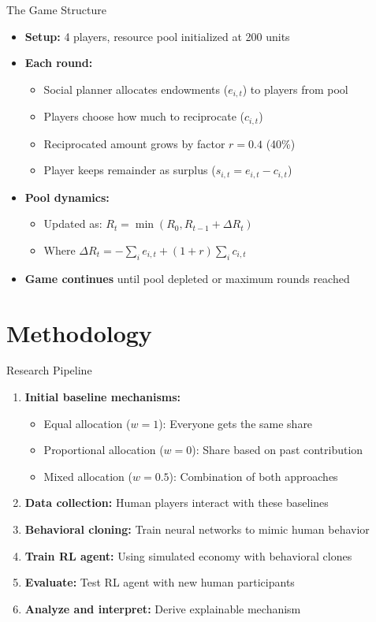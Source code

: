 \documentclass[aspectratio=169]{beamer} %
\begin{document}
\begin{frame}{The Game Structure}
\begin{itemize}
    \item \textbf{Setup:} 4 players, resource pool initialized at 200 units
    \item \textbf{Each round:}
    \begin{itemize}
        \item Social planner allocates endowments ($e_{i,t}$) to players from pool
        \item Players choose how much to reciprocate ($c_{i,t}$)
        \item Reciprocated amount grows by factor $r = 0.4$ (40\%)
        \item Player keeps remainder as surplus ($s_{i,t} = e_{i,t} - c_{i,t}$)
    \end{itemize}
    \item \textbf{Pool dynamics:} 
    \begin{itemize}
        \item Updated as: $R_t = \min(R_0, R_{t-1} + \Delta R_t)$
        \item Where $\Delta R_t = -\sum_i e_{i,t} + (1+r)\sum_i c_{i,t}$
    \end{itemize}
    \item \textbf{Game continues} until pool depleted or maximum rounds reached
\end{itemize}
\end{frame}

\section{Methodology}

\begin{frame}{Research Pipeline}
\begin{enumerate}
    \item \textbf{Initial baseline mechanisms:}
    \begin{itemize}
        \item Equal allocation ($w = 1$): Everyone gets the same share
        \item Proportional allocation ($w = 0$): Share based on past contribution
        \item Mixed allocation ($w = 0.5$): Combination of both approaches
    \end{itemize}
    \item \textbf{Data collection:} Human players interact with these baselines
    \item \textbf{Behavioral cloning:} Train neural networks to mimic human behavior
    \item \textbf{Train RL agent:} Using simulated economy with behavioral clones
    \item \textbf{Evaluate:} Test RL agent with new human participants
    \item \textbf{Analyze and interpret:} Derive explainable mechanism
\end{enumerate}
\end{frame}
\end{document}
